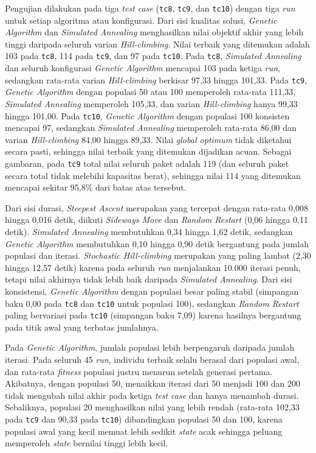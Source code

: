 Pengujian dilakukan pada tiga \textit{test case} (\texttt{tc8}, \texttt{tc9}, dan \texttt{tc10}) dengan tiga \textit{run} untuk setiap algoritma atau konfigurasi. Dari sisi kualitas solusi, \textit{Genetic Algorithm} dan \textit{Simulated Annealing} menghasilkan nilai objektif akhir yang lebih tinggi daripada seluruh varian \textit{Hill-climbing}. Nilai terbaik yang ditemukan adalah 103 pada \texttt{tc8}, 114 pada \texttt{tc9}, dan 97 pada \texttt{tc10}. Pada \texttt{tc8}, \textit{Simulated Annealing} dan seluruh konfigurasi \textit{Genetic Algorithm} mencapai 103 pada ketiga \textit{run}, sedangkan rata-rata varian \textit{Hill-climbing} berkisar 97,33 hingga 101,33. Pada \texttt{tc9}, \textit{Genetic Algorithm} dengan populasi 50 atau 100 memperoleh rata-rata 111,33, \textit{Simulated Annealing} memperoleh 105,33, dan varian \textit{Hill-climbing} hanya 99,33 hingga 101,00. Pada \texttt{tc10}, \textit{Genetic Algorithm} dengan populasi 100 konsisten mencapai 97, sedangkan \textit{Simulated Annealing} memperoleh rata-rata 86,00 dan varian \textit{Hill-climbing} 84,00 hingga 89,33. Nilai \textit{global optimum} tidak diketahui secara pasti, sehingga nilai terbaik yang ditemukan dijadikan acuan. Sebagai gambaran, pada \texttt{tc9} total nilai seluruh paket adalah 119 (dan seluruh paket secara total tidak melebihi kapasitas berat), sehingga nilai 114 yang ditemukan mencapai sekitar 95,8\% dari batas atas tersebut.

Dari sisi durasi, \textit{Steepest Ascent} merupakan yang tercepat dengan rata-rata 0,008 hingga 0,016 detik, diikuti \textit{Sideways Move} dan \textit{Random Restart} (0,06 hingga 0,11 detik). \textit{Simulated Annealing} membutuhkan 0,34 hingga 1,62 detik, sedangkan \textit{Genetic Algorithm} membutuhkan 0,10 hingga 0,90 detik bergantung pada jumlah populasi dan iterasi. \textit{Stochastic Hill-climbing} merupakan yang paling lambat (2,30 hingga 12,57 detik) karena pada seluruh \textit{run} menjalankan 10.000 iterasi penuh, tetapi nilai akhirnya tidak lebih baik daripada \textit{Simulated Annealing}. Dari sisi konsistensi, \textit{Genetic Algorithm} dengan populasi besar paling stabil (simpangan baku 0,00 pada \texttt{tc8} dan \texttt{tc10} untuk populasi 100), sedangkan \textit{Random Restart} paling bervariasi pada \texttt{tc10} (simpangan baku 7,09) karena hasilnya bergantung pada titik awal yang terbatas jumlahnya.

Pada \textit{Genetic Algorithm}, jumlah populasi lebih berpengaruh daripada jumlah iterasi. Pada seluruh 45 \textit{run}, individu terbaik selalu berasal dari populasi awal, dan rata-rata \textit{fitness} populasi justru menurun setelah generasi pertama. Akibatnya, dengan populasi 50, menaikkan iterasi dari 50 menjadi 100 dan 200 tidak mengubah nilai akhir pada ketiga \textit{test case} dan hanya menambah durasi. Sebaliknya, populasi 20 menghasilkan nilai yang lebih rendah (rata-rata 102,33 pada \texttt{tc9} dan 90,33 pada \texttt{tc10}) dibandingkan populasi 50 dan 100, karena populasi awal yang kecil memuat lebih sedikit \textit{state} acak sehingga peluang memperoleh \textit{state} bernilai tinggi lebih kecil.

